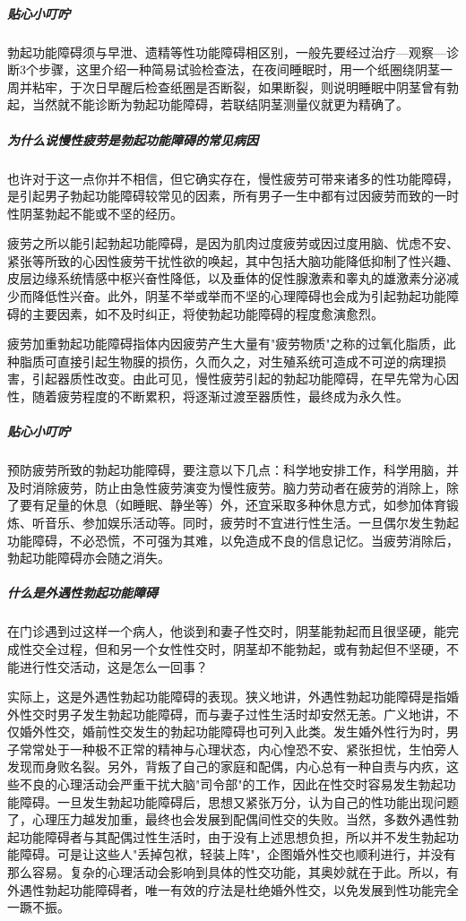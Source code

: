 \subparagraph{贴心小叮咛}

勃起功能障碍须与早泄、遗精等性功能障碍相区别，一般先要经过治疗—观察—诊断3个步骤，这里介绍一种简易试验检查法，在夜间睡眠时，用一个纸圈绕阴茎一周并粘牢，于次日早醒后检查纸圈是否断裂，如果断裂，则说明睡眠中阴茎曾有勃起，当然就不能诊断为勃起功能障碍，若联结阴茎测量仪就更为精确了。

\subparagraph{为什么说慢性疲劳是勃起功能障碍的常见病因}

也许对于这一点你并不相信，但它确实存在，慢性疲劳可带来诸多的性功能障碍，是引起男子勃起功能障碍较常见的因素，所有男子一生中都有过因疲劳而致的一时性阴茎勃起不能或不坚的经历。

疲劳之所以能引起勃起功能障碍，是因为肌肉过度疲劳或因过度用脑、忧虑不安、紧张等所致的心因性疲劳干扰性欲的唤起，其中包括大脑功能降低抑制了性兴趣、皮层边缘系统情感中枢兴奋性降低，以及垂体的促性腺激素和睾丸的雄激素分泌减少而降低性兴奋。此外，阴茎不举或举而不坚的心理障碍也会成为引起勃起功能障碍的主要因素，如不及时纠正，将使勃起功能障碍的程度愈演愈烈。

疲劳加重勃起功能障碍指体内因疲劳产生大量有"疲劳物质"之称的过氧化脂质，此种脂质可直接引起生物膜的损伤，久而久之，对生殖系统可造成不可逆的病理损害，引起器质性改变。由此可见，慢性疲劳引起的勃起功能障碍，在早先常为心因性，随着疲劳程度的不断累积，将逐渐过渡至器质性，最终成为永久性。

\subparagraph{贴心小叮咛}

预防疲劳所致的勃起功能障碍，要注意以下几点：科学地安排工作，科学用脑，并及时消除疲劳，防止由急性疲劳演变为慢性疲劳。脑力劳动者在疲劳的消除上，除了要有足量的休息（如睡眠、静坐等）外，还宜采取多种休息方式，如参加体育锻炼、听音乐、参加娱乐活动等。同时，疲劳时不宜进行性生活。一旦偶尔发生勃起功能障碍，不必恐慌，不可强为其难，以免造成不良的信息记忆。当疲劳消除后，勃起功能障碍亦会随之消失。

\subparagraph{什么是外遇性勃起功能障碍}

在门诊遇到过这样一个病人，他谈到和妻子性交时，阴茎能勃起而且很坚硬，能完成性交全过程，但和另一个女性性交时，阴茎却不能勃起，或有勃起但不坚硬，不能进行性交活动，这是怎么一回事？

实际上，这是外遇性勃起功能障碍的表现。狭义地讲，外遇性勃起功能障碍是指婚外性交时男子发生勃起功能障碍，而与妻子过性生活时却安然无恙。广义地讲，不仅婚外性交，婚前性交发生的勃起功能障碍也可列入此类。发生婚外性行为时，男子常常处于一种极不正常的精神与心理状态，内心惶恐不安、紧张担忧，生怕旁人发现而身败名裂。另外，背叛了自己的家庭和配偶，内心总有一种自责与内疚，这些不良的心理活动会严重干扰大脑"司令部"的工作，因此在性交时容易发生勃起功能障碍。一旦发生勃起功能障碍后，思想又紧张万分，认为自己的性功能出现问题了，心理压力越发加重，最终也会发展到配偶间性交的失败。当然，多数外遇性勃起功能障碍者与其配偶过性生活时，由于没有上述思想负担，所以并不发生勃起功能障碍。可是让这些人"丢掉包袱，轻装上阵"，企图婚外性交也顺利进行，并没有那么容易。复杂的心理活动会影响到具体的性交功能，其奥妙就在于此。所以，有外遇性勃起功能障碍者，唯一有效的疗法是杜绝婚外性交，以免发展到性功能完全一蹶不振。

